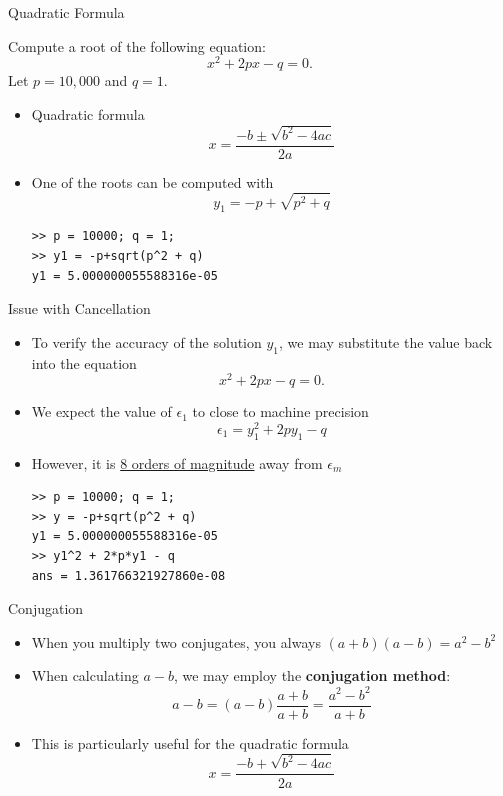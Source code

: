 \documentclass[10pt]{beamer}
\begin{document}
\begin{frame}[fragile]{Quadratic Formula}

\begin{example}
Compute a root of the following equation: 
\[
x^2 + 2 p x - q = 0.
\] 
Let $p=10,000$ and $q=1$.
\end{example}

\begin{itemize}
    \item Quadratic formula $$ x = \frac{-b\pm \sqrt{b^2-4ac}}{2a}$$
    
    \item One of the roots can be computed with $$ y_1 = -p + \sqrt{p^2 + q}$$
    
\begin{lstlisting} 
>> p = 10000; q = 1;
>> y1 = -p+sqrt(p^2 + q) 
y1 = 5.000000055588316e-05  
\end{lstlisting} 

\end{itemize}
\end{frame}
\begin{frame}[fragile]{Issue with Cancellation}

    \begin{itemize}
        \item To verify the accuracy of the solution $y_1$, we may substitute the value back into the equation 
            \[
            x^2 + 2 p x - q = 0.
            \] 
        \item We expect the value of $\epsilon_1$ to close to machine precision  
        \[
        \epsilon_1 = y_1^2 + 2 p y_1 - q 
        \] 
        \item However, it is \underline{8 orders of magnitude} away from $\epsilon_m$
\begin{lstlisting} 
>> p = 10000; q = 1;
>> y = -p+sqrt(p^2 + q) 
y1 = 5.000000055588316e-05  
>> y1^2 + 2*p*y1 - q  
ans = 1.361766321927860e-08
\end{lstlisting} 
        
    \end{itemize}
    
\end{frame}
\begin{frame}{Conjugation}


\begin{itemize}
    \item When you multiply two conjugates, you always $(a+b)(a-b) = a^2 - b^2$
    \item When calculating $a-b$, we may employ the \textbf{conjugation method}:
        $$a-b = (a-b)\frac{a+b}{a+b} = \frac{a^2-b^2}{a+b} $$
    \item This is particularly useful for the quadratic formula 
        $$ x = \frac{-b + \sqrt{b^2-4ac}}{2a} $$

\end{itemize}


\end{frame}
\end{document}
